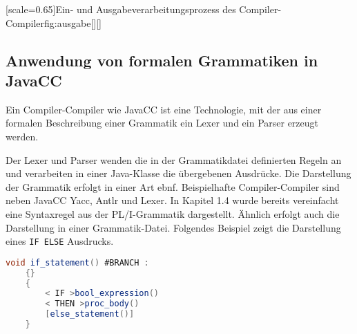 [scale=0.65]{Ein- und Ausgabeverarbeitungsprozess des Compiler-Compiler}{fig:ausgabe}[][]





     
\pagebreak
\subsection{Anwendung von formalen Grammatiken in JavaCC}

Ein Compiler-Compiler wie JavaCC ist eine Technologie, mit der aus einer formalen Beschreibung einer Grammatik ein Lexer und ein Parser erzeugt werden. 

Der Lexer und Parser wenden die in der Grammatikdatei definierten Regeln an und verarbeiten in einer Java-Klasse die übergebenen Ausdrücke.
Die Darstellung der Grammatik erfolgt in einer Art \ac{ebnf}.  Beispielhafte Compiler-Compiler sind neben JavaCC Yacc, Antlr und Lexer. In Kapitel 1.4 wurde bereits vereinfacht eine Syntaxregel aus der PL/I-Grammatik dargestellt. Ähnlich erfolgt auch die Darstellung in einer Grammatik-Datei. Folgendes Beispiel zeigt die Darstellung eines \verb+IF ELSE+ Ausdrucks. 


\begin{lstlisting}[language=Java, caption=JavaCC Syntaxregel einer Verzweigung, label={lst:ifstatement}]
	void if_statement() #BRANCH :
	{}
	{
		< IF >bool_expression()
		< THEN >proc_body()
		[else_statement()]
	}
\end{lstlisting}

